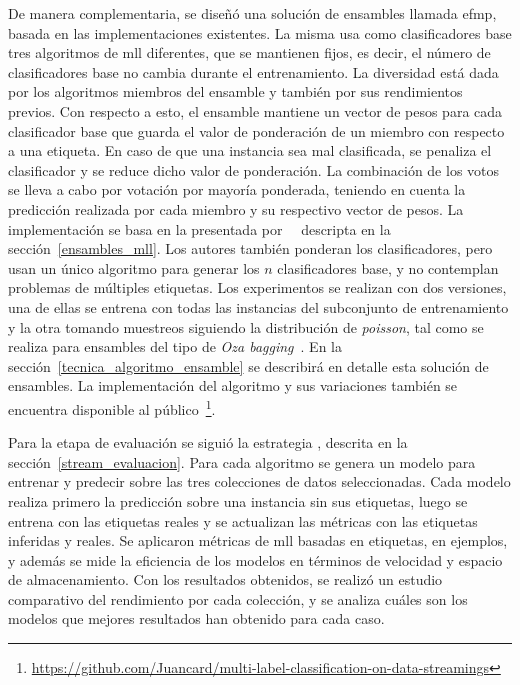 De manera complementaria, se diseñó una solución de ensambles llamada
\acrfull{efmp}, basada en las implementaciones existentes. La misma usa como
clasificadores base tres algoritmos de \acrshort{mll} diferentes, que se
mantienen fijos, es decir, el número de clasificadores base no cambia durante el
entrenamiento. La diversidad está dada por los algoritmos miembros del ensamble
y también por sus rendimientos previos. Con respecto a esto, el ensamble
mantiene un vector de pesos para cada clasificador base que guarda el valor de
ponderación de un miembro con respecto a una etiqueta. En caso de que una
instancia sea mal clasificada, se penaliza el clasificador y se reduce dicho
valor de ponderación. La combinación de los votos se lleva a cabo por votación
por mayoría ponderada, teniendo en cuenta la predicción realizada por cada
miembro y su respectivo vector de pesos. La implementación se basa en la
presentada por~\citeauthor{kolter_dynamic_2007}~\cite{kolter_dynamic_2007}
descripta en la sección~\ref{ensambles_mll}. Los autores también ponderan los
clasificadores, pero usan un único algoritmo para generar los $n$ clasificadores
base, y no contemplan problemas de múltiples etiquetas. Los experimentos se
realizan con dos versiones, una de ellas se entrena con todas las instancias del
subconjunto de entrenamiento y la otra tomando muestreos siguiendo la
distribución de \textit{poisson}, tal como se realiza para ensambles del tipo de
\textit{Oza bagging}~\cite{oza_online_2005}. En la
sección~\ref{tecnica_algoritmo_ensamble} se describirá en detalle esta solución
de ensambles. La implementación del algoritmo y sus variaciones también se
encuentra disponible al
público~\footnote{\url{https://github.com/Juancard/multi-label-classification-on-data-streamings}}.

Para la etapa de evaluación se siguió la estrategia
, descrita en la sección~\ref{stream_evaluacion}.
Para cada algoritmo se genera un modelo para entrenar y predecir sobre las tres
colecciones de datos seleccionadas. Cada modelo realiza primero la predicción
sobre una instancia sin sus etiquetas, luego se entrena con las etiquetas reales
y se actualizan las métricas con las etiquetas inferidas y reales. Se aplicaron
métricas de \acrshort{mll} basadas en etiquetas, en ejemplos, y además se mide
la eficiencia de los modelos en términos de velocidad y espacio de
almacenamiento. Con los resultados obtenidos, se realizó un estudio comparativo
del rendimiento por cada colección, y se analiza cuáles son los modelos que
mejores resultados han obtenido para cada caso.

